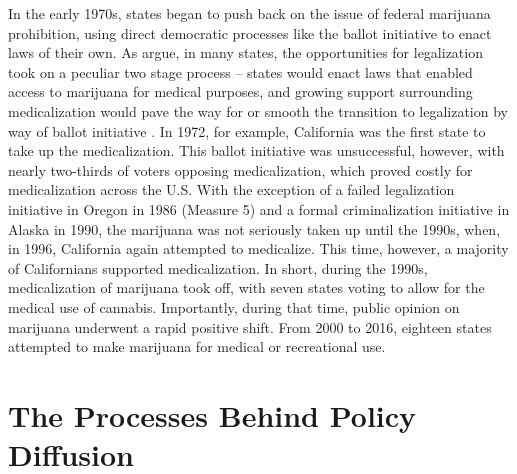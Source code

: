 In the early 1970s, states began to push back on the issue of federal marijuana prohibition, using direct democratic processes like the ballot initiative to enact laws of their own. As \citet{newhart_and_dolphin_2018} argue, in many states, the opportunities for legalization took on a peculiar two stage process -- states would enact laws that enabled access to marijuana for medical purposes, and growing support surrounding medicalization would pave the way for or smooth the transition to legalization by way of ballot initiative \citep{kilmer_and_maccoun_2017}. In 1972, for example, California was the first state to take up the medicalization. This ballot initiative was unsuccessful, however, with nearly two-thirds of voters opposing medicalization, which proved costly for medicalization across the U.S. With the exception of a failed legalization initiative in Oregon in 1986 (Measure 5) and a formal criminalization initiative in Alaska in 1990, the marijuana was not seriously taken up until the 1990s, when, in 1996, California again attempted to medicalize. This time, however, a majority of Californians supported medicalization. In short, during the 1990s, medicalization of marijuana took off, with seven states voting to allow for the medical use of cannabis. Importantly, during that time, public opinion on marijuana underwent a rapid positive shift. From 2000 to 2016, eighteen states attempted to make marijuana for medical or recreational use.


\begin{center}
{\renewcommand\normalsize{\scriptsize}

}
\end{center}



  



\section{The Processes Behind Policy Diffusion}





